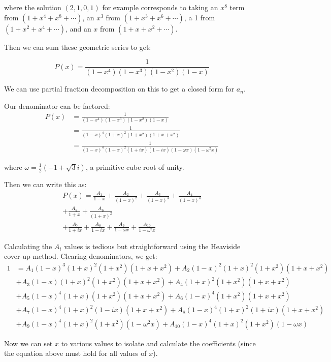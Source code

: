 \documentclass{article}
\begin{document}
where the solution $(2,1,0,1)$ for example corresponds to taking an $x^8$ term from
$(1+x^4+x^8+\cdots)$, an $x^3$ from $(1+x^3+x^6+\cdots)$, a 1 from $(1+x^2+x^4+\cdots)$,
and an $x$ from $(1+x+x^2+\cdots)$.

Then we can sum these geometric series to get:

\[P(x) = \frac{1}{(1-x^4)(1-x^3)(1-x^2)(1-x)} \]

We can use partial fraction decomposition on this to get a closed form for $a_n$.

Our denominator can be factored:
\begin{align*}
 P(x) &= \frac{1}{(1-x^4)(1-x^3)(1-x^2)(1-x)} \\
      &= \frac{1}{(1-x)^4(1+x)^2(1+x^2)(1+x+x^2)} \\
      &= \frac{1}{(1-x)^4(1+x)^2(1+ix)(1-ix)(1-\omega x)(1 - \omega^2 x)}
\end{align*}

where $\omega = \frac{1}{2}(-1+\sqrt{3}i)$, a primitive cube root of unity.

Then we can write this as:
\begin{multline*}
    P(x) = \frac{A_1}{1 - x} + \frac{A_2}{(1 - x)^2} + \frac{A_3}{(1 - x)^3} + \frac{A_4}{(1 - x)^4} \\
    + \frac{A_5}{1 + x} + \frac{A_6}{(1 + x)^2} \\
    + \frac{A_7}{1 + ix} + \frac{A_8}{1 - ix} + \frac{A_9}{1 - \omega x} + \frac{A_{10}}{1 - \omega^2 x}
\end{multline*}

Calculating the $A_i$ values is tedious but straightforward using the Heaviside cover-up
method. Clearing denominators, we get:
\begin{align*}
    1 &= A_1(1-x)^3(1+x)^2(1+x^2)(1+x+x^2) + A_2(1-x)^2(1+x)^2(1+x^2)(1+x+x^2) \\
    &+ A_3(1-x)(1+x)^2(1+x^2)(1+x+x^2) + A_4(1+x)^2(1+x^2)(1+x+x^2) \\
    &+ A_5(1-x)^4(1+x)(1+x^2)(1+x+x^2) + A_6(1-x)^4(1+x^2)(1+x+x^2) \\
    &+ A_7(1-x)^4(1+x)^2(1-ix)(1+x+x^2) + A_8(1-x)^4(1+x)^2(1+ix)(1+x+x^2) \\
    &+ A_9(1-x)^4(1+x)^2(1+x^2)(1-\omega^2 x) + A_{10}(1-x)^4(1+x)^2(1+x^2)(1 - \omega x)
\end{align*}

Now we can set $x$ to various values to isolate and calculate the coefficients (since the equation above must hold for all values of $x$).
\end{document}
